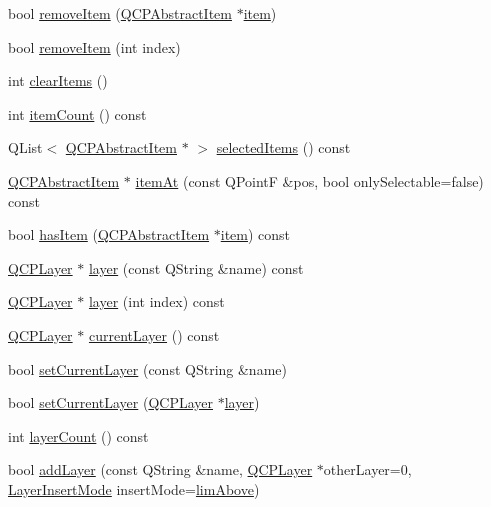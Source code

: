 \begin{DoxyCompactItemize}
\item 
bool \hyperlink{classQCustomPlot_ae04446557292551e8fb6e2c106e1848d}{remove\-Item} (\hyperlink{classQCPAbstractItem}{\-Q\-C\-P\-Abstract\-Item} $\ast$\hyperlink{classQCustomPlot_a3e842b5a65b1d17fbb96cfb1fa1314d1}{item})
\item 
bool \hyperlink{classQCustomPlot_abcfdda3d601c0441cab136137d715dea}{remove\-Item} (int index)
\item 
int \hyperlink{classQCustomPlot_abdfd07d4f0591d0cf967f85013fd3645}{clear\-Items} ()
\item 
int \hyperlink{classQCustomPlot_a6fc860e30df17fd5c46056bf6fe29390}{item\-Count} () const 
\item 
\-Q\-List$<$ \hyperlink{classQCPAbstractItem}{\-Q\-C\-P\-Abstract\-Item} $\ast$ $>$ \hyperlink{classQCustomPlot_a1a48b13547e2d9ac5cd6927516f47a2e}{selected\-Items} () const 
\item 
\hyperlink{classQCPAbstractItem}{\-Q\-C\-P\-Abstract\-Item} $\ast$ \hyperlink{classQCustomPlot_a793e4b04e0ede11a733021907368fa83}{item\-At} (const \-Q\-Point\-F \&pos, bool only\-Selectable=false) const 
\item 
bool \hyperlink{classQCustomPlot_ab4199c38b03e63a2623c82453fe8add5}{has\-Item} (\hyperlink{classQCPAbstractItem}{\-Q\-C\-P\-Abstract\-Item} $\ast$\hyperlink{classQCustomPlot_a3e842b5a65b1d17fbb96cfb1fa1314d1}{item}) const 
\item 
\hyperlink{classQCPLayer}{\-Q\-C\-P\-Layer} $\ast$ \hyperlink{classQCustomPlot_aac492da01782820454e9136a8db28182}{layer} (const \-Q\-String \&name) const 
\item 
\hyperlink{classQCPLayer}{\-Q\-C\-P\-Layer} $\ast$ \hyperlink{classQCustomPlot_a1e73051e371f1815b48d8b355be0d2ab}{layer} (int index) const 
\item 
\hyperlink{classQCPLayer}{\-Q\-C\-P\-Layer} $\ast$ \hyperlink{classQCustomPlot_af73057345656cbd1463454982d808b00}{current\-Layer} () const 
\item 
bool \hyperlink{classQCustomPlot_a73a6dc47c653bb6f8f030abca5a11852}{set\-Current\-Layer} (const \-Q\-String \&name)
\item 
bool \hyperlink{classQCustomPlot_a23a4d3cadad1a0063c5fe19aac5659e6}{set\-Current\-Layer} (\hyperlink{classQCPLayer}{\-Q\-C\-P\-Layer} $\ast$\hyperlink{classQCustomPlot_aac492da01782820454e9136a8db28182}{layer})
\item 
int \hyperlink{classQCustomPlot_a1b3926884f5bd4bdda1495d8b3c891d0}{layer\-Count} () const 
\item 
bool \hyperlink{classQCustomPlot_ad5255393df078448bb6ac83fa5db5f52}{add\-Layer} (const \-Q\-String \&name, \hyperlink{classQCPLayer}{\-Q\-C\-P\-Layer} $\ast$other\-Layer=0, \hyperlink{classQCustomPlot_a75a8afbe6ef333b1f3d47abb25b9add7}{\-Layer\-Insert\-Mode} insert\-Mode=\hyperlink{classQCustomPlot_a75a8afbe6ef333b1f3d47abb25b9add7a062b0b7825650b432a713c0df6742d41}{lim\-Above})

\end{DoxyCompactItemize}
